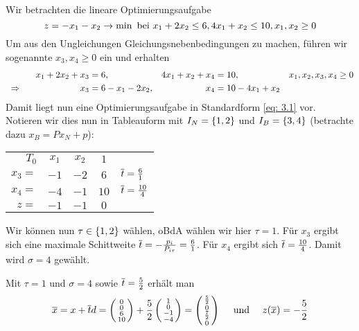 \begin{beispiel} %
	\label{beispiel: 3.2}
	Wir betrachten die lineare Optimierungsaufgabe
	\begin{equation*}
		z = -x_1 - x_2 \to \min \text{ bei } x_1 + 2 x_2 \le 6, 4x_1 + x_2 \le 10, x_1, x_2 \ge 0
	\end{equation*} 
	Um aus den Ungleichungen Gleichungsnebenbedingungen zu machen, führen wir sogenannte  $x_3, x_4 \ge 0$ ein und erhalten
	\begin{equation*}
		\begin{alignedat}{3}
			x_1 + 2 x_2 + x_3 &= 6, &\quad  4x_1 + x_2 + x_4 &= 10, &\quad x_1, x_2, x_3, x_4 &\ge 0 \\
			\enskip \Rightarrow \enskip \qquad \qquad \qquad x_3 &= 6 - x_1 - 2x_2, & \quad x_4 &= 10 - 4x_1 + x_2 &&
		\end{alignedat}
	\end{equation*}
	Damit liegt nun eine Optimierungsaufgabe in Standardform \eqref{eq: 3.1} vor. Notieren wir dies nun in Tableauform mit $I_N = \left\{ 1,2 \right\}$ und $I_B = \left\{ 3,4 \right\}$ (betrachte dazu $x_B = Px_N + p$):	
	\begin{center}
		\begin{tabular}{r|cc|c l}
			$T_0$ & $x_1$ & $x_2$ & $1$ \\ \cline{1-4}
			$x_3 = $ & $-1$ & $-2$ & $6$ & {\footnotesize $\overline{t} = \frac{6}{1}$} \\ 
			$x_4 = $ & $-4$ & $-1$ & $10$ & {\footnotesize $\overline{t} = \frac{10}{4}$} \\ \cline{1-4}
			$z =$ & $-1$ & $-1$    & $0$
		\end{tabular}
	\end{center}
	Wir können nun $\tau \in \left\{ 1,2 \right\}$ wählen, oBdA wählen wir hier $\tau = 1$.
	Für $x_3$ ergibt sich eine maximale Schittweite $\overline{t} = -\frac{p_i}{P_{i \tau}} = \frac{6}{1}$. Für $x_4$ ergibt sich $\overline{t} = \frac{10}{4}$.  Damit wird $\sigma = 4$ gewählt.
	
	Mit $\tau = 1$ und $\sigma = 4$ sowie $\overline{t} = \frac{5}{2}$ erhält man
	\begin{equation*}
		\overline{x} = x + \overline{t} d = \left( \begin{smallmatrix} 0 \\ 0 \\ 6 \\ 10 \end{smallmatrix} \right) + \frac{5}{2} \left( \begin{smallmatrix} 1 \\ 0 \\ -1 \\-4 \end{smallmatrix} \right)
		= \left( \begin{smallmatrix} \frac{5}{2} \\ 0 \\ \frac{7}{2} \\ 0 \end{smallmatrix} \right)
		\quad \text{ und } \quad 
		z(\overline{x}) = -\frac{5}{2}
	\end{equation*}
\end{beispiel}

